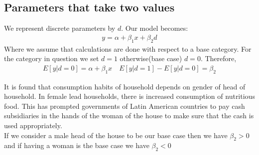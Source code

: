 \documentclass[notoc]{tufte-book}
\begin{document}
\subsection{Parameters that take two values}
We represent discrete parameters by $d$. Our model becomes:
\begin{align}
    y=\alpha+\beta_1x+\beta_2d
\end{align}
Where we assume that calculations are done with respect to a base category. For the category in question we set $d=1$ otherwise(base case) $d=0$. Therefore,
\begin{align}
    E[y|d=0]=\alpha +\beta_1x\quad E[y|d=1]-E[y|d=0]=\beta_2
\end{align}
\begin{tcolorbox}[colback=c4,colframe=c3,title=Example 1.3: Variation of consumption with gender of head of family,breakable]
It is found that consumption habits of household depends on gender of head of household. In female lead households, there is increased consumption of nutritious food. This has prompted governments of Latin American countries to pay cash subsidiaries in the hands of the woman of the house to make sure that the cash is used appropriately.\\
If we consider a male head of the house to be our base case then we have $\beta_2>0$ and if having a woman is the base case we have $\beta_2<0$
\end{tcolorbox}
\end{document}
